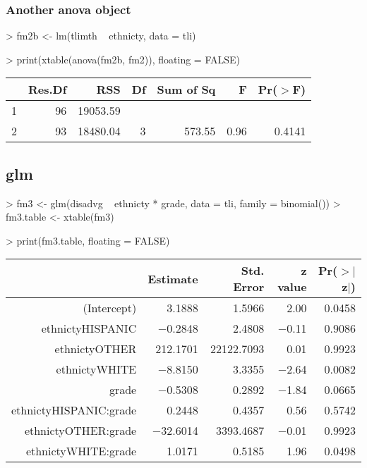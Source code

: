 \documentclass[letterpaper]{article}
\begin{document}
\subsubsection{Another anova object}
\begin{Schunk}
\begin{Sinput}
> fm2b <- lm(tlimth ~ ethnicty, data = tli)
\end{Sinput}
\end{Schunk}
\begin{Schunk}
\begin{Sinput}
> print(xtable(anova(fm2b, fm2)), floating = FALSE)
\end{Sinput}
% latex table generated in R 2.6.0 by xtable 1.5-2 package
% Wed Oct 10 14:26:36 2007
\begin{tabular}{lrrrrrr}
  \hline
 & Res.Df & RSS & Df & Sum of Sq & F & Pr($>$F) \\
  \hline
1 & 96 & 19053.59 &  &  &  &  \\
  2 & 93 & 18480.04 & 3 & 573.55 & 0.96 & 0.4141 \\
   \hline
\end{tabular}\end{Schunk}


\subsection{glm}

\begin{Schunk}
\begin{Sinput}
> fm3 <- glm(disadvg ~ ethnicty * grade, data = tli, family = binomial())
> fm3.table <- xtable(fm3)
\end{Sinput}
\end{Schunk}
\begin{Schunk}
\begin{Sinput}
> print(fm3.table, floating = FALSE)
\end{Sinput}
% latex table generated in R 2.6.0 by xtable 1.5-2 package
% Wed Oct 10 14:26:36 2007
\begin{tabular}{rrrrr}
  \hline
 & Estimate & Std. Error & z value & Pr($>$$|$z$|$) \\
  \hline
(Intercept) & 3.1888 & 1.5966 & 2.00 & 0.0458 \\
  ethnictyHISPANIC & $-$0.2848 & 2.4808 & $-$0.11 & 0.9086 \\
  ethnictyOTHER & 212.1701 & 22122.7093 & 0.01 & 0.9923 \\
  ethnictyWHITE & $-$8.8150 & 3.3355 & $-$2.64 & 0.0082 \\
  grade & $-$0.5308 & 0.2892 & $-$1.84 & 0.0665 \\
  ethnictyHISPANIC:grade & 0.2448 & 0.4357 & 0.56 & 0.5742 \\
  ethnictyOTHER:grade & $-$32.6014 & 3393.4687 & $-$0.01 & 0.9923 \\
  ethnictyWHITE:grade & 1.0171 & 0.5185 & 1.96 & 0.0498 \\
   \hline
\end{tabular}\end{Schunk}
\end{document}
